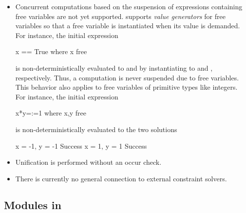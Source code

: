 \begin{itemize}
\item
Concurrent computations
based on the suspension of expressions
containing free variables are not yet supported.
\CYS supports \emph{value generators} for free variables
so that a free variable is instantiated when its value is demanded.
For instance, the initial expression
\begin{curry}
x == True where x free
\end{curry}
is non-deterministically evaluated to  and 
by instantiating  to  and , respectively.
Thus, a computation is never suspended due to free variables.
This behavior also applies to free variables of primitive types
like integers. For instance, the initial expression
\begin{curry}
x*y=:=1 where x,y free
\end{curry}
is non-deterministically evaluated to the two solutions
\begin{curry}
{x = -1, y = -1} Success
{x = 1, y = 1} Success
\end{curry}
\item
Unification is performed without an occur check.
\item
There is currently no general connection to external constraint solvers.
\end{itemize}


\subsection{Modules in \CYS}
\label{sec-modules}

